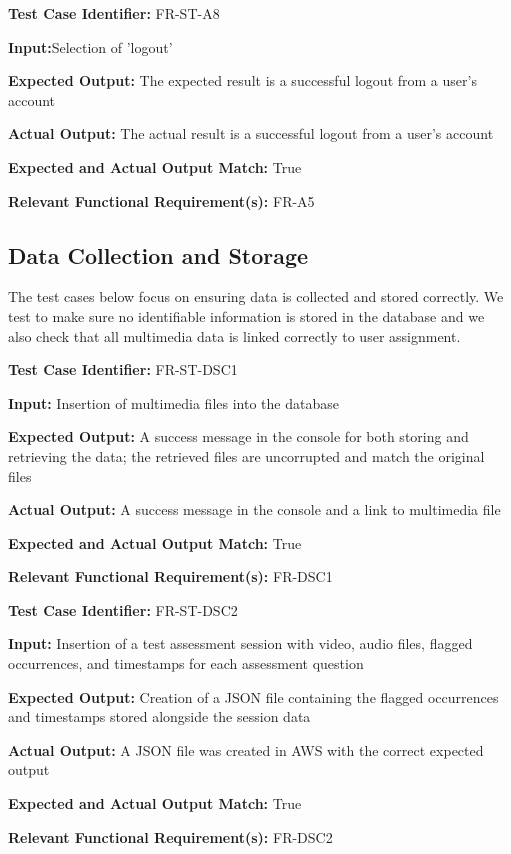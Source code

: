 \documentclass[12pt, titlepage]{article}
\begin{document}
\begin{mdframed}[linewidth=0.5mm] \par
  \textbf{Test Case Identifier:} FR-ST-A8 \par
  \textbf{Input:}Selection of 'logout' \par
  \textbf{Expected Output:} The expected result is a successful logout from a user’s account \par
  \textbf{Actual Output:} The actual result is a successful logout from a user’s account\par
  \textbf{Expected and Actual Output Match:} True \par
  \textbf{Relevant Functional Requirement(s):} FR-A5
\end{mdframed}

\subsection{Data Collection and Storage}
\hspace{2em}The test cases below focus on ensuring data is collected and stored correctly. We test to make sure
no identifiable information is stored in the database and we also check that all multimedia data is linked correctly to user assignment.

\begin{mdframed}[linewidth=0.5mm] \par
  \textbf{Test Case Identifier:} FR-ST-DSC1 \par
  \textbf{Input:} Insertion of multimedia files into the database \par
  \textbf{Expected Output:} A success message in the console for both storing and retrieving the data; the retrieved files are uncorrupted and match the original files \par
  \textbf{Actual Output:} A success message in the console and a link to multimedia file \par
  \textbf{Expected and Actual Output Match:} True \par
  \textbf{Relevant Functional Requirement(s):} FR-DSC1
\end{mdframed}

\begin{mdframed}[linewidth=0.5mm] \par
  \textbf{Test Case Identifier:} FR-ST-DSC2 \par
  \textbf{Input:} Insertion of a test assessment session with video, audio files, flagged occurrences, and timestamps for each assessment question \par
  \textbf{Expected Output:} Creation of a JSON file containing the flagged occurrences and timestamps stored alongside the session data \par
  \textbf{Actual Output:} A JSON file was created in AWS with the correct expected output \par
  \textbf{Expected and Actual Output Match:} True \par
  \textbf{Relevant Functional Requirement(s):} FR-DSC2
\end{mdframed}
\end{document}
